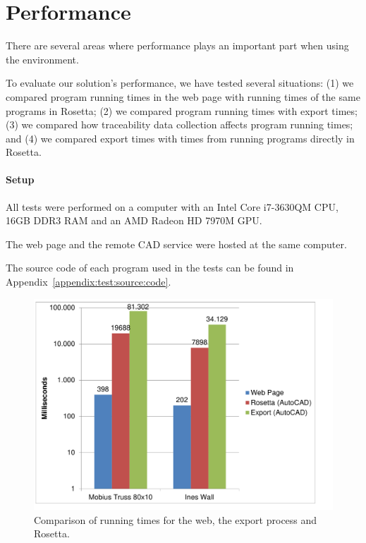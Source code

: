 

\section{Performance}
There are several areas where performance plays an important part when using the environment.

To evaluate our solution's performance, we have tested several situations: (1) we compared program running times in the web page with running times of the same programs in Rosetta; (2) we compared program running times with export times; (3) we compared how traceability data collection affects program running times; and (4) we compared export times with times from running programs directly in Rosetta.

\paragraph{Setup}
All tests were performed on a computer with an Intel Core i7-3630QM CPU, 16GB DDR3 RAM and an AMD Radeon HD 7970M GPU.

The web page and the remote CAD service were hosted at the same computer.

The source code of each program used in the tests can be found in Appendix~\ref{appendix:test:source:code}. %

\begin{figure}
  \centering
  \includegraphics[width=12cm]{./images/run_export_rosetta_times}
  \caption{Comparison of running times for the web, the export process and Rosetta.}
  \label{fig:run:export:rosetta:chart}
\end{figure}



